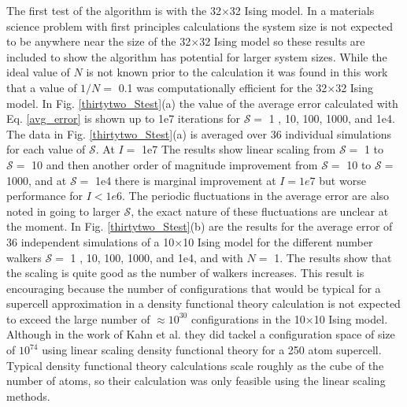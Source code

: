 \documentclass[aps,pre,reprint,superscriptaddress,showkeys]{revtex4-1}
\begin{document}
The first test of the algorithm is with the 32$\times$32 Ising model. In a materials science problem with first principles calculations the system size is not expected to be anywhere near the size of the  32$\times$32 Ising model so these results are included to show the algorithm has potential for larger system sizes. While the ideal value of $N$ is not known prior to the calculation it was found in this work that a value of $1/N=$ 0.1 was computationally efficient for the 32$\times$32 Ising model. In Fig. \ref{thirtytwo_Stest}(a) the value of the average error calculated with Eq. \ref{avg_error} is shown up to 1e7 iterations for $\mathcal{S}=$ 1 , 10, 100, 1000, and 1e4. The data in Fig. \ref{thirtytwo_Stest}(a) is averaged over 36 individual simulations for each value of $\mathcal{S}$. At $I=$ 1e7 The results show linear scaling from $\mathcal{S}=$ 1 to $\mathcal{S}=$ 10 and then another order of magnitude improvement from $\mathcal{S}=$ 10 to $\mathcal{S}=$ 1000, and at $\mathcal{S}=$ 1e4 there is marginal improvement at $I=1e7$ but worse performance for $I<1e6$.  The periodic fluctuations in the average error are also noted in going to larger $\mathcal{S}$, the exact nature of these fluctuations are unclear at the moment. In Fig. \ref{thirtytwo_Stest}(b) are  the results for the average error of 36 independent simulations of a 10$\times$10 Ising model for the different number walkers $\mathcal{S}=$ 1 , 10, 100, 1000, and 1e4, and  with $N=$ 1. The results show that the scaling is quite good as the number of walkers increases. This result is encouraging because the number of configurations that would be typical for a supercell approximation in a density functional theory calculation is not expected to exceed the large number of $\approx 10^{30}$ configurations in the 10$\times$10 Ising model.  Although in the work of  Kahn et al. \cite{FP_Wang_Landau_CuZn} they did tackel a configuration space of size of $ 10^{74}$ using linear scaling density functional theory for a 250 atom supercell. Typical density functional theory calculations scale roughly as the cube of the number of atoms, so their calculation was only feasible using the linear scaling methods.   
\end{document}
